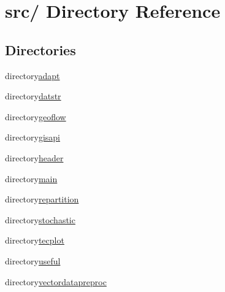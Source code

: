 \hypertarget{dir_000000}{
\section{src/ Directory Reference}
\label{dir_000000}
}
\subsection*{Directories}
\begin{CompactItemize}
\item 
directory\hyperlink{dir_000007}{adapt}
\item 
directory\hyperlink{dir_000008}{datstr}
\item 
directory\hyperlink{dir_000006}{geoflow}
\item 
directory\hyperlink{dir_000010}{gisapi}
\item 
directory\hyperlink{dir_000001}{header}
\item 
directory\hyperlink{dir_000004}{main}
\item 
directory\hyperlink{dir_000002}{repartition}
\item 
directory\hyperlink{dir_000009}{stochastic}
\item 
directory\hyperlink{dir_000005}{tecplot}
\item 
directory\hyperlink{dir_000011}{useful}
\item 
directory\hyperlink{dir_000003}{vectordatapreproc}
\end{CompactItemize}
